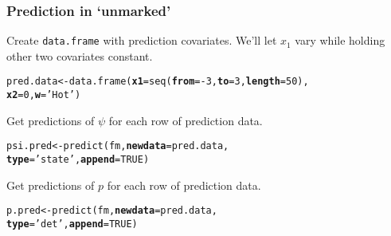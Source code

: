 \documentclass[color=usenames,dvipsnames]{beamer}\usepackage[]{graphicx}\usepackage[]{color}
\makeatletter
\newcommand{\hlnum}[1]{\textcolor[rgb]{0.69,0.494,0}{#1}}%
\newcommand{\hlstr}[1]{\textcolor[rgb]{0.749,0.012,0.012}{#1}}%
\newcommand{\hlopt}[1]{\textcolor[rgb]{0,0,0}{#1}}%
\newcommand{\hlstd}[1]{\textcolor[rgb]{0,0,0}{#1}}%
\newcommand{\hlkwb}[1]{\textcolor[rgb]{0,0.341,0.682}{#1}}%
\newcommand{\hlkwc}[1]{\textcolor[rgb]{0,0,0}{\textbf{#1}}}%
\newcommand{\hlkwd}[1]{\textcolor[rgb]{0.004,0.004,0.506}{#1}}%
\newenvironment{kframe}{%
 \def\at@end@of@kframe{}%
 \ifinner\ifhmode%
  \def\at@end@of@kframe{\end{minipage}}%
  \begin{minipage}{\columnwidth}%
 \fi\fi%
 \def\FrameCommand##1{\hskip\@totalleftmargin \hskip-\fboxsep
 \colorbox{shadecolor}{##1}\hskip-\fboxsep
     \hskip-\linewidth \hskip-\@totalleftmargin \hskip\columnwidth}%
 \MakeFramed {\advance\hsize-\width
   \@totalleftmargin\z@ \linewidth\hsize
   \@setminipage}}%
 {\par\unskip\endMakeFramed%
 \at@end@of@kframe}
\newenvironment{knitrout}{}{} %
\makeatother
\begin{document}
\begin{frame}[fragile]
  \frametitle{Prediction in `unmarked'}
  Create \texttt{data.frame} with prediction covariates. We'll let $x_1$
  vary while holding other two covariates constant.  
\begin{knitrout}\small
{}\color{fgcolor}\begin{kframe}
\begin{alltt}
\hlstd{pred.data} \hlkwb{<-} \hlkwd{data.frame}\hlstd{(}\hlkwc{x1}\hlstd{=}\hlkwd{seq}\hlstd{(}\hlkwc{from}\hlstd{=}\hlopt{-}\hlnum{3}\hlstd{,} \hlkwc{to}\hlstd{=}\hlnum{3}\hlstd{,} \hlkwc{length}\hlstd{=}\hlnum{50}\hlstd{),}
                        \hlkwc{x2}\hlstd{=}\hlnum{0}\hlstd{,} \hlkwc{w}\hlstd{=}\hlstr{'Hot'}\hlstd{)}
\end{alltt}
\end{kframe}
\end{knitrout}
\pause
\vfill
Get predictions of $\psi$ for each row of prediction data.
\begin{knitrout}\small
{}\color{fgcolor}\begin{kframe}
\begin{alltt}
\hlstd{psi.pred} \hlkwb{<-} \hlkwd{predict}\hlstd{(fm,} \hlkwc{newdata}\hlstd{=pred.data,}
                    \hlkwc{type}\hlstd{=}\hlstr{'state'}\hlstd{,} \hlkwc{append}\hlstd{=}\hlnum{TRUE}\hlstd{)}
\end{alltt}
\end{kframe}
\end{knitrout}
\pause
\vfill
Get predictions of $p$ for each row of prediction data.
\begin{knitrout}\small
{}\color{fgcolor}\begin{kframe}
\begin{alltt}
\hlstd{p.pred} \hlkwb{<-} \hlkwd{predict}\hlstd{(fm,} \hlkwc{newdata}\hlstd{=pred.data,}
                  \hlkwc{type}\hlstd{=}\hlstr{'det'}\hlstd{,} \hlkwc{append}\hlstd{=}\hlnum{TRUE}\hlstd{)}
\end{alltt}
\end{kframe}
\end{knitrout}
\end{frame}
\end{document}
